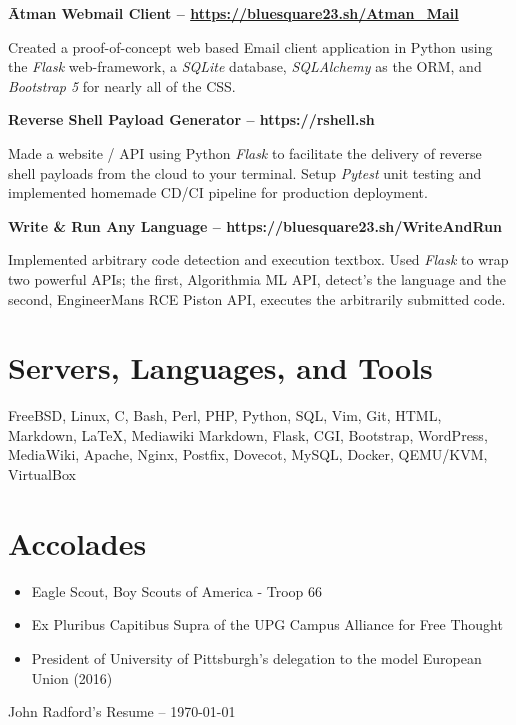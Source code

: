 \documentclass{article}
\begin{document}
\noindent
\textbf{Ātman Webmail Client -- \url{https://bluesquare23.sh/Atman_Mail}}

Created a proof-of-concept web based Email client application in Python using
the \emph{Flask} web-framework, a \emph{SQLite} database, \emph{SQLAlchemy} as
the ORM, and \emph{Bootstrap 5} for nearly all of the CSS.

\noindent
\textbf{Reverse Shell Payload Generator -- https://rshell.sh}

Made a website / API using Python \emph{Flask} to facilitate the delivery of
reverse shell payloads from the cloud to your terminal. Setup \emph{Pytest}
unit testing and implemented homemade CD/CI pipeline for production deployment.

\noindent
\textbf{Write \& Run Any Language -- https://bluesquare23.sh/WriteAndRun}

Implemented arbitrary code detection and execution textbox. Used \emph{Flask}
to wrap two powerful APIs; the first, Algorithmia ML API, detect's the language
and the second, EngineerMans RCE Piston API, executes the arbitrarily submitted
code.

\section{Servers, Languages, and Tools}

FreeBSD, Linux, C, Bash, Perl, PHP, Python, SQL, Vim, Git, HTML, Markdown,
{\LaTeX}, Mediawiki Markdown, Flask, CGI, Bootstrap, WordPress, MediaWiki,
Apache, Nginx, Postfix, Dovecot, MySQL, Docker, QEMU/KVM, VirtualBox 

\section{Accolades}

\begin{itemize}
\itemsep0em

\item Eagle Scout, Boy Scouts of America - Troop 66

\item Ex Pluribus Capitibus Supra of the UPG Campus Alliance for Free Thought

\item President of University of Pittsburgh's delegation to the model European Union (2016)
\end{itemize}

\begin{center}
John Radford's Resume -- \small\today\\
\end{center}
\end{document}
